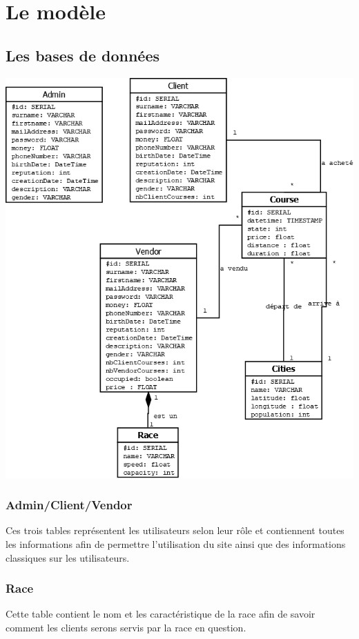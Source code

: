 \documentclass{article}
\begin{document}
\section{Le modèle}
	\subsection{Les bases de données}
		\begin{center}
		 \includegraphics[scale=0.4]{diagrammeTotal.png}
		\end{center}

		\subsubsection{Admin/Client/Vendor}
			Ces trois tables représentent les utilisateurs selon leur rôle et contiennent toutes les informations afin de permettre l'utilisation du site ainsi que des informations classiques sur les utilisateurs.
		\subsubsection{Race}
			Cette table contient le nom et les caractéristique de la race afin de savoir comment les clients serons servis par la race en question.
\end{document}
